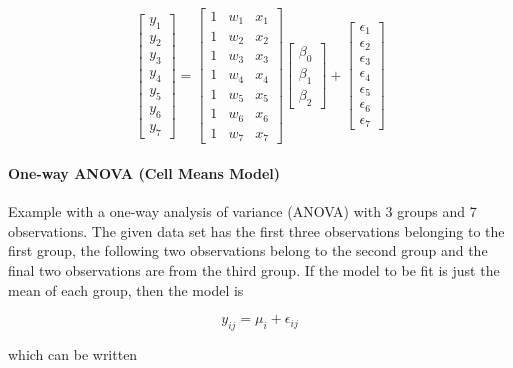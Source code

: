 \begin{equation}
  \begin{bmatrix}y_1 \\ y_2 \\ y_3 \\ y_4 \\ y_5 \\ y_6 \\ y_7 \end{bmatrix} =
    \begin{bmatrix} 1 & w_1 & x_1  \\1 & w_2 & x_2  \\1 & w_3 & x_3  \\1 & w_4 & x_4  \\1 & w_5 & x_5  \\1 & w_6 & x_6 \\ 1& w_7  & x_7  \end{bmatrix}
    \begin{bmatrix} \beta_0 \\ \beta_1 \\ \beta_2  \end{bmatrix}
    +
    \begin{bmatrix} \epsilon_1 \\ \epsilon_2 \\ \epsilon_3 \\ \epsilon_4 \\ \epsilon_5 \\ \epsilon_6 \\ \epsilon_7 \end{bmatrix}
\end{equation}

\paragraph{One-way ANOVA (Cell Means Model)}
Example with a one-way analysis of variance (ANOVA) with 3 groups and 7 observations. The given data set has the first three observations belonging to the first group, the following two observations belong to the second group and the final two observations are from the third group.
If the model to be fit is just the mean of each group, then the model is

\begin{equation}
  y_{ij} = \mu_i + \epsilon_{ij}
\end{equation}

which can be written

